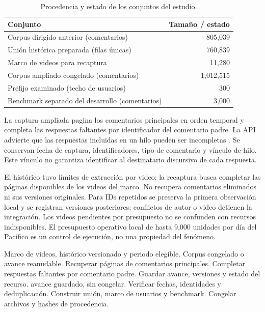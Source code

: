 \documentclass[conference,letterpaper]{IEEEtran}
\begin{document}
\begin{table}[t]
\centering\small
\caption{Procedencia y estado de los conjuntos del estudio.}
\label{tab:corpus}
\begin{tabular}{p{}r}
\toprule
Conjunto & Tamaño / estado\\\midrule
Corpus dirigido anterior (comentarios) & 805,039\\
Unión histórica preparada (filas únicas) & 760,839\\
Marco de videos para recaptura & 11,280\\
Corpus ampliado congelado (comentarios) & 1,012,515\\
Prefijo examinado (techo de usuarios) & 300\\
Benchmark separado del desarrollo (comentarios) & 3,000\\\bottomrule
\end{tabular}
\end{table}

La captura ampliada pagina los comentarios principales en orden temporal y completa las respuestas faltantes por identificador del comentario padre. La API advierte que las respuestas incluidas en un hilo pueden ser incompletas \cite{YoutubeThreads}. Se conservan fecha de captura, identificadores, tipo de comentario y vínculo de hilo. Este vínculo no garantiza identificar al destinatario discursivo de cada respuesta.

El histórico tuvo límites de extracción por video; la recaptura busca completar las páginas disponibles de los videos del marco. No recupera comentarios eliminados ni sus versiones originales. Para IDs repetidos se preserva la primera observación local y se registran versiones posteriores; conflictos de autor o video detienen la integración. Los videos pendientes por presupuesto no se confunden con recursos indisponibles. El presupuesto operativo local de hasta 9,000 unidades por día del Pacífico es un control de ejecución, no una propiedad del fenómeno.

\begin{algorithm}[t]
\caption{Captura y congelación del corpus dirigido}
\label{alg:captura}
\begin{algorithmic}[1]
\Require Marco de videos, histórico versionado y periodo elegible.
\Ensure Corpus congelado o avance reanudable.
\State Recuperar páginas de comentarios principales.
\State Completar respuestas faltantes por comentario padre.
\State Guardar avance, versiones y estado del recurso.
\State \Return avance guardado, sin congelar.
\EndIf
\EndFor
{}
\State Verificar fechas, identidades y deduplicación.
\State Construir unión, marco de usuarios y benchmark.
\State Congelar archivos y hashes de procedencia.
\EndIf
\end{algorithmic}
\end{algorithm}
\end{document}
